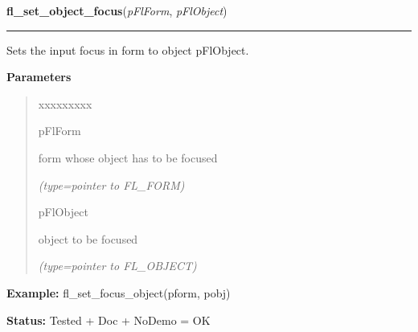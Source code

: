 \hspace{.8\funcindent}\begin{boxedminipage}{\funcwidth}

    \raggedright \textbf{fl\_set\_object\_focus}(\textit{pFlForm}, \textit{pFlObject})

    \vspace{-1.5ex}

    \rule{\textwidth}{0.5\fboxrule}
\setlength{\parskip}{2ex}
    Sets the input focus in form to object pFlObject.

\setlength{\parskip}{1ex}
      \textbf{Parameters}
      \vspace{-1ex}

      \begin{quote}
        \begin{Ventry}{xxxxxxxxx}

          \item[pFlForm]

          form whose object has to be focused

            {\it (type=pointer to FL\_FORM)}

          \item[pFlObject]

          object to be focused

            {\it (type=pointer to FL\_OBJECT)}

        \end{Ventry}

      \end{quote}

\textbf{Example:} fl\_set\_focus\_object(pform, pobj)



\textbf{Status:} Tested + Doc + NoDemo = OK



    \end{boxedminipage}

    \label{xformslib:flbasic:fl_get_focus_object}

    \vspace{0.5ex}

